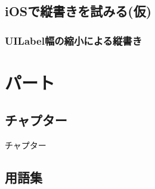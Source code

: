 \documentclass[10pt,twoside,openright,dvipdfmx]{jsbook}
\begin{document}
\chapter{iOSで縦書きを試みる(仮)}\label{chapter:ios/vertical}
\thispagestyle{plain}

\section{{\sf UILabel}幅の縮小による縦書き}\label{chapter:ios/vertical/numberOfLines}


\part{パート}\label{part:draft}
\restoregeometry

\chapter{チャプター}\label{chapter:draft}
\thispagestyle{plain}
チャプター


\begin{appendices}
\restoregeometry
\chapter{用語集}
\thispagestyle{fancy}

\end{appendices}

\printbibheading[heading=bibintoc,title={参考文献}]
\thispagestyle{plain}
\printbibliography[heading=subbibintoc,type=online,title={Online}]

\printindex
\end{document}
